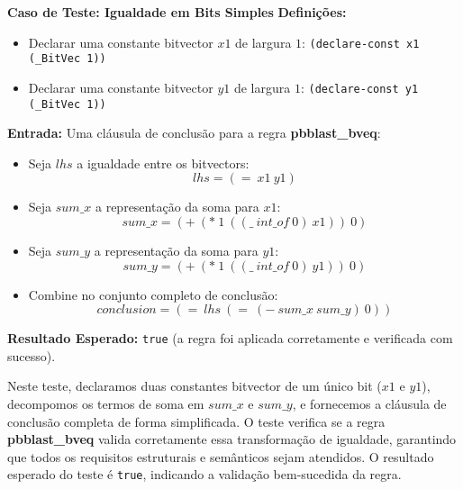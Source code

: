 \documentclass[conference]{IEEEtran}
\begin{document}
\begin{algorithmic}[1]
    \Statex \textbf{Caso de Teste: Igualdade em Bits Simples}
    \State \textbf{Definições:}
    \begin{itemize}
        \item Declarar uma constante bitvector $x1$ de largura $1$: \texttt{(declare-const x1 (\_BitVec 1))}
        \item Declarar uma constante bitvector $y1$ de largura $1$: \texttt{(declare-const y1 (\_BitVec 1))}
    \end{itemize}
    \State \textbf{Entrada:} Uma cláusula de conclusão para a regra \textbf{pbblast\_bveq}:
    \begin{itemize}
        \item Seja $lhs$ a igualdade entre os bitvectors:
              \[
                  lhs = (=\ x1\ y1)
              \]
        \item Seja $sum\_x$ a representação da soma para $x1$:
              \[
                  sum\_x = (+\ (*\ 1\ ((\_\ int\_of\ 0)\ x1))\ 0)
              \]
        \item Seja $sum\_y$ a representação da soma para $y1$:
              \[
                  sum\_y = (+\ (*\ 1\ ((\_\ int\_of\ 0)\ y1))\ 0)
              \]
        \item Combine no conjunto completo de conclusão:
              \[
                  conclusion = (=\ lhs\ (=\ (-\ sum\_x\ sum\_y)\ 0))
              \]
    \end{itemize}
    \State \textbf{Resultado Esperado:} \texttt{true} (a regra foi aplicada corretamente e verificada com sucesso).
    \EndProcedure

    \Statex
    \Statex Neste teste, declaramos duas constantes bitvector de um único bit ($x1$ e $y1$), decompomos os termos de soma em $sum\_x$ e $sum\_y$, e fornecemos a cláusula de conclusão completa de forma simplificada. O teste verifica se a regra \textbf{pbblast\_bveq} valida corretamente essa transformação de igualdade, garantindo que todos os requisitos estruturais e semânticos sejam atendidos. O resultado esperado do teste é \texttt{true}, indicando a validação bem-sucedida da regra.
\end{algorithmic}
\end{document}
